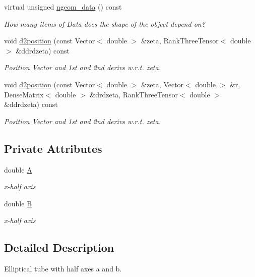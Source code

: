 \begin{DoxyCompactItemize}
virtual unsigned \hyperlink{classoomph_1_1Plate_a495af9d0abd0af9a9f25ac3bfa4820e4}{ngeom\+\_\+data} () const
\begin{DoxyCompactList}\small\item\em How many items of Data does the shape of the object depend on? \end{DoxyCompactList}\item 
void \hyperlink{classoomph_1_1Plate_ac44838098ef36d9400c534252579d6e4}{d2position} (const Vector$<$ double $>$ \&zeta, Rank\+Three\+Tensor$<$ double $>$ \&ddrdzeta) const
\begin{DoxyCompactList}\small\item\em Position Vector and 1st and 2nd derivs w.\+r.\+t. zeta. \end{DoxyCompactList}\item 
void \hyperlink{classoomph_1_1Plate_ad3f465392d03904976c58c1d55c7d6cc}{d2position} (const Vector$<$ double $>$ \&zeta, Vector$<$ double $>$ \&r, Dense\+Matrix$<$ double $>$ \&drdzeta, Rank\+Three\+Tensor$<$ double $>$ \&ddrdzeta) const
\begin{DoxyCompactList}\small\item\em Position Vector and 1st and 2nd derivs w.\+r.\+t. zeta. \end{DoxyCompactList}\end{DoxyCompactItemize}
\subsection*{Private Attributes}
\begin{DoxyCompactItemize}
\item 
double \hyperlink{classoomph_1_1Plate_a482d24b39713ccb85e6e8cf7ce942c42}{A}
\begin{DoxyCompactList}\small\item\em x-\/half axis \end{DoxyCompactList}\item 
double \hyperlink{classoomph_1_1Plate_a4e549830e4d7c76536cf4140220313f2}{B}
\begin{DoxyCompactList}\small\item\em x-\/half axis \end{DoxyCompactList}\end{DoxyCompactItemize}


\subsection{Detailed Description}
Elliptical tube with half axes a and b. 

